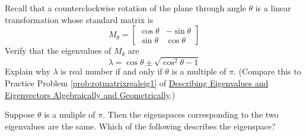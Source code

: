 \documentclass{ximera}
\begin{document}
\begin{problem}\label{prob:rotmatrixrealeig2}
Recall that a counterclockwise rotation of the plane through angle $\theta$ is a linear transformation whose standard matrix is $$M_{\theta}=\begin{bmatrix}\cos\theta&-\sin\theta\\\sin\theta&\cos\theta\end{bmatrix}$$
Verify that the eigenvalues of $M_{\theta}$ are
$$\lambda=\cos\theta\pm\sqrt{\cos^2\theta-1}$$
Explain why $\lambda$ is real number if and only if $\theta$ is a multiple of $\pi$.  (Compare this to Practice Problem \ref{prob:rotmatrixrealeig1} of \href{https://ximera.osu.edu/oerlinalg/LinearAlgebra/EIG-0010/main}{Describing Eigenvalues and Eigenvectors Algebraically and Geometrically}.)

Suppose $\theta$ is a muliple of $\pi$.  Then the eigenspaces corresponding to the two eigenvalues are the same.  Which of the following describes the eigenspace?
\begin{multipleChoice}
\end{multipleChoice}

\end{problem}
\end{document}
